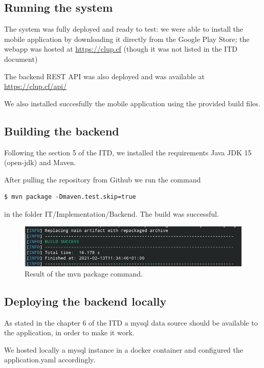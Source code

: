 \subsection{Running the system}

The system was fully deployed and ready to test: we were able to install the mobile application by downloading it directly from the Google Play Store; the webapp was hosted at \href{https://clup.cf}{https://clup.cf} (though it was not listed in the ITD document)

The backend REST API was also deployed and was available at \href{https://clup.cf/api/}{https://clup.cf/api/}

We also installed succesfully the mobile application using the provided build files.

\subsection{Building the backend}

Following the section 5 of the ITD, we installed the requirements Java JDK 15 (open-jdk) and Maven.

After pulling the repository from Github we run the command
\begin{lstlisting}[columns=fullflexible]
    $ mvn package -Dmaven.test.skip=true
\end{lstlisting}
in the folder IT/Implementation/Backend. The build was successful.
\begin{figure}[ht]
    \centering
    \includegraphics[width=\textwidth]{Images/package.jpg}
    \caption{\label{fig:Booked_Ticket_State}Result of the mvn package command.}
\end{figure}

\subsection{Deploying the backend locally}
As stated in the chapter 6 of the ITD a mysql data source should be available to the application, in order to make it work.

We hosted locally a mysql instance in a docker container and configured the application.yaml accordingly.

